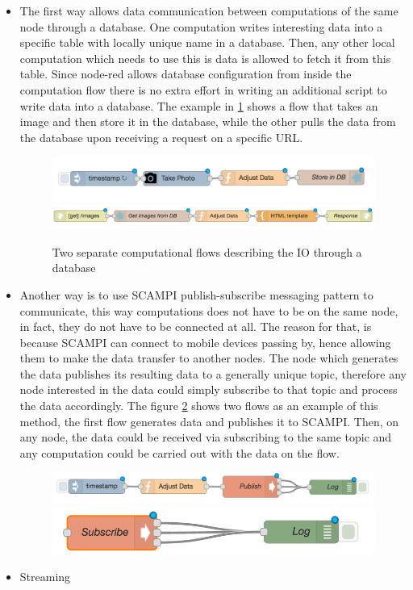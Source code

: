 \begin{itemize}
\item The first way allows data communication between computations of the same node through a database. One computation  writes interesting data into a specific table with locally unique name in a database. Then, any other local computation which needs to use this is data is allowed to fetch it from this table. Since node-red allows database configuration from inside the computation flow there is no extra effort in writing an additional script to write data into a database. The example in \ref{fig:db} shows a flow that takes an image and then store it in the database, while the other pulls the data from the database upon receiving a request on a specific URL. 

\begin{figure}[H]
	\centering
	\includegraphics[scale=0.5]{images/db-out.png}
	\includegraphics[scale=0.5]{images/db-in.png}
	\caption{Two separate computational flows describing the IO through a database }
	\label{fig:db}
\end{figure}

\item Another way is to use SCAMPI publish-subscribe messaging pattern to communicate, this way computations  does not have to be on the same node, in fact, they do not have to be connected at all. The reason for that, is because SCAMPI can connect to mobile devices passing by, hence allowing them to make the data transfer  to another nodes. The node which generates the data publishes its resulting data to a generally unique topic, therefore any node interested in the data could simply subscribe to that topic and process the data accordingly. The figure \ref{fig:scampi} shows two flows as an example of this method, the first flow generates data and publishes it to SCAMPI. Then, on any node, the data could be received via subscribing to the same topic and any computation could be carried out with the data on the flow. 

\begin{figure}[H]
	\centering
	\includegraphics[scale=0.6]{images/SCAMPI-pub.png}
	\includegraphics[scale=0.6]{images/SCAMPI-sub.png}
	\caption{ }
	\label{fig:scampi}
\end{figure}

\item Streaming
\end{itemize}	


